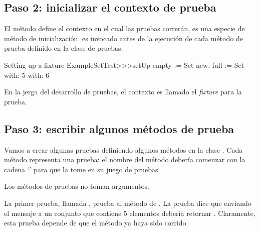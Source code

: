 \documentclass[a4paper,10pt,twoside]{book}
\begin{document}
\subsection{Paso 2: inicializar el contexto de prueba}

El m\'etodo  define el contexto en el cual las
pruebas correr\'an, es una especie de m\'etodo de inicializaci\'on.
 es invocado antes de la ejecuci\'on de cada m\'etodo de prueba definido
en la clase de pruebas.




\begin{method}[setupExampleSetTest]{Setting up a fixture}
ExampleSetTest>>>setUp
	empty := Set new.
	full := Set with: 5 with: 6
\end{method}

\noindent
En la jerga del desarrollo de pruebas, el contexto es llamado el \emph{fixture} para la prueba.


\subsection{Paso 3: escribir algunos m\'etodos de prueba}

Vamos a crear algunas pruebas definiendo algunos m\'etodos en la clase .  
Cada m\'etodo representa una prueba: 
el nombre del m\'etodo deber\'ia comenzar con la cadena `' para que \sunit
la tome en su juego de pruebas.

Los m\'etodos de pruebas no toman argumentos.

La primer prueba, llamada , prueba al m\'etodo
 de .  La prueba dice que enviando el mensaje  a un conjunto
que contiene 5 elementos deber\'ia retornar .  Claramente, esta prueba depende de que el
m\'etodo  ya haya sido corrido.
\end{document}
